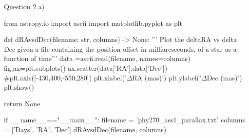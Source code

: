 \documentclass{article}
\begin{document}
Question 2 a)
\begin{equation}
   \label{code: 2)a)} 
\end{equation}
\begin{python}
from astropy.io import ascii
import matplotlib.pyplot as plt


def dRAvsdDec(filename: str, columns) -> None:
    ''' Plot the deltaRA vs delta Dec given a file containing the position offset in
    milliarcseconds, of a star as a function of time'''
    data =ascii.read(filename, names=columns)
    fig,ax=plt.subplots()
    ax.scatter(data['RA'],data['Dec'])
    #plt.axis([-430,400,-550,280])
    plt.xlabel('$\Delta$RA (mas)')
    plt.ylabel('$\Delta$Dec (mas)')
    plt.show()
    
    return None
    
if __name__=="__main__":
    filename = 'phy270_ass1_parallax.txt'
    columns = ['Days', 'RA', 'Dec']
    dRAvsdDec(filename, columns)    
\end{python}
\end{document}
